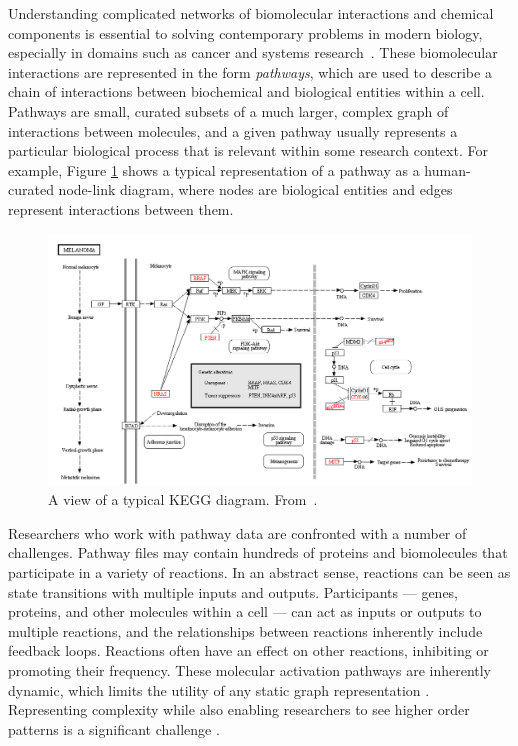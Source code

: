 \documentclass{egpubl}
\begin{document}
Understanding complicated networks of biomolecular interactions and chemical components is essential to solving contemporary problems in modern biology, especially in domains such as cancer and systems research~\cite{hanahan2011hallmarks}.
These biomolecular interactions are represented in the form \emph{pathways}, which are used to describe a chain of interactions between biochemical and biological entities within a cell.
Pathways are small, curated subsets of a much larger, complex graph of interactions between molecules, and a given pathway usually represents a particular biological process that is relevant within some research context.
For example, Figure \ref{fig:kvik} shows a typical representation of a pathway as a human-curated node-link diagram, where nodes are biological entities and edges represent interactions between them.

\begin{figure}[htb]
  \centering
  \includegraphics[width=\linewidth]{figures/kegg2}
  \caption{\label{fig:kvik} A view of a typical KEGG diagram. From~\cite{Fjukstad2014kvik}.}
\end{figure}


Researchers who work with pathway data are confronted with a number of challenges.
Pathway files may contain hundreds of proteins and biomolecules that participate in a variety of reactions.
In an abstract sense, reactions can be seen as state transitions with multiple inputs and outputs.
Participants --- genes, proteins, and other molecules within a cell --- can act as inputs or outputs to multiple reactions, and the relationships between reactions inherently include feedback loops.
Reactions often have an effect on other reactions, inhibiting or promoting their frequency.
These molecular activation pathways are inherently dynamic, which limits the utility of any static graph representation \cite{kitano2002systems}.
Representing complexity while also enabling researchers to see higher order patterns is a significant challenge \cite{saraiya2005visualizing}.
\end{document}
